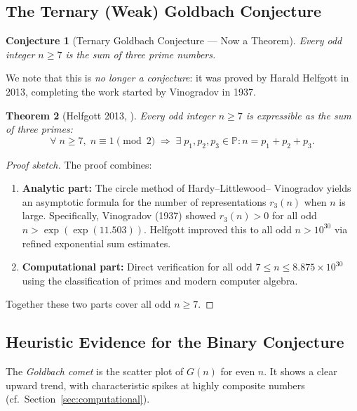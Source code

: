 \documentclass[12pt,a4paper]{amsart}
\newtheorem{theorem}{Theorem}[section]
\newtheorem{conjecture}[theorem]{Conjecture}
\theoremstyle{definition}
\newcommand{\Primes}{\mathbb{P}}
\begin{document}
\subsection{The Ternary (Weak) Goldbach Conjecture}

\begin{conjecture}[Ternary Goldbach Conjecture --- Now a Theorem]\label{conj:goldbach-ternary}
Every odd integer $n \geq 7$ is the sum of three prime numbers.
\end{conjecture}

We note that this is \emph{no longer a conjecture}: it was proved by
Harald Helf\-gott in 2013, completing the work started by Vinogradov in
1937.

\begin{theorem}[Helfgott 2013, \cite{Helfgott2013}]\label{thm:helfgott}
Every odd integer $n \geq 7$ is expressible as the sum of three primes:
\[
  \forall\; n \geq 7,\; n \equiv 1 \pmod{2} \;\Longrightarrow\;
  \exists\; p_1, p_2, p_3 \in \Primes : n = p_1 + p_2 + p_3.
\]
\end{theorem}

\begin{proof}[Proof sketch]
The proof combines:
\begin{enumerate}[label=(\roman*)]
\item \textbf{Analytic part:} The circle method of Hardy--Littlewood--
      Vinogradov yields an asymptotic formula for the number of
      representations $r_3(n)$ when $n$ is large.  Specifically,
      Vinogradov (1937) showed $r_3(n) > 0$ for all odd $n > \exp(\exp(11.503))$.
      Helfgott improved this to all odd $n > 10^{30}$ via refined
      exponential sum estimates.
\item \textbf{Computational part:} Direct verification for all odd
      $7 \leq n \leq 8.875 \times 10^{30}$ using the classification of
      primes and modern computer algebra.
\end{enumerate}
Together these two parts cover all odd $n \geq 7$.
\end{proof}

\subsection{Heuristic Evidence for the Binary Conjecture}

The \emph{Goldbach comet} is the scatter plot of $G(n)$ for even $n$.
It shows a clear upward trend, with characteristic spikes at
highly composite numbers (cf.\ Section~\ref{sec:computational}).
\end{document}
